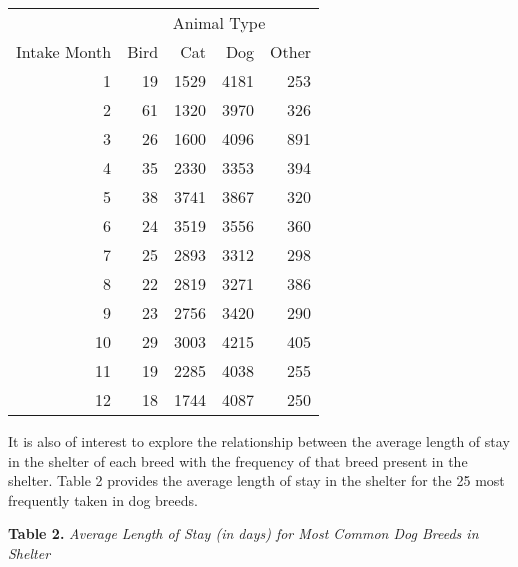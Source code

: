 \documentclass[
  11pt,
]{article}
\begin{document}
\captionsetup[table]{labelformat=empty,skip=1pt}
\begin{longtable}{rrrrr}
\toprule
 & \multicolumn{4}{c}{Animal Type} \\ 
 \cmidrule(lr){2-5}
Intake Month & Bird & Cat & Dog & Other \\ 
\midrule
1 & 19 & 1529 & 4181 & 253 \\ 
2 & 61 & 1320 & 3970 & 326 \\ 
3 & 26 & 1600 & 4096 & 891 \\ 
4 & 35 & 2330 & 3353 & 394 \\ 
5 & 38 & 3741 & 3867 & 320 \\ 
6 & 24 & 3519 & 3556 & 360 \\ 
7 & 25 & 2893 & 3312 & 298 \\ 
8 & 22 & 2819 & 3271 & 386 \\ 
9 & 23 & 2756 & 3420 & 290 \\ 
10 & 29 & 3003 & 4215 & 405 \\ 
11 & 19 & 2285 & 4038 & 255 \\ 
12 & 18 & 1744 & 4087 & 250 \\ 
 \bottomrule
\end{longtable}

It is also of interest to explore the relationship between the average
length of stay in the shelter of each breed with the frequency of that
breed present in the shelter. Table 2 provides the average length of
stay in the shelter for the 25 most frequently taken in dog breeds.

\textbf{Table 2.} \emph{Average Length of Stay (in days) for Most Common
Dog Breeds in Shelter} \begingroup\fontsize{11}{13}\selectfont
\end{document}
